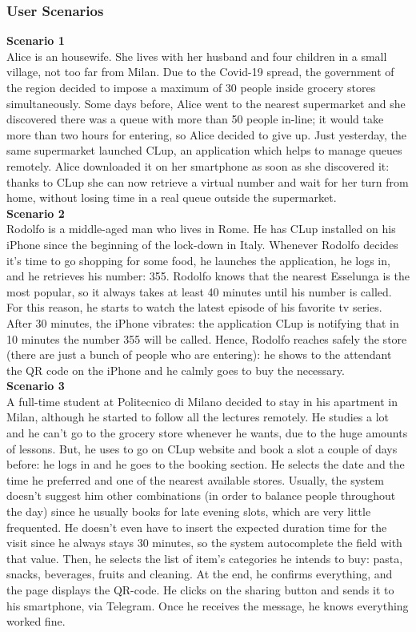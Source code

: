 \documentclass[table, 12pt]{article}
\begin{document}
\subsubsection{User Scenarios}
\textbf{Scenario 1}\\
Alice is an housewife. She lives with her husband and four children in a small village, not too far from Milan. Due to the Covid-19 spread, the government of the region decided to impose a maximum of 30 people inside grocery stores simultaneously. Some days before, Alice went to the nearest supermarket and she discovered there was a queue with more than 50 people in-line; it would take more than two hours for entering, so Alice decided to give up. Just yesterday, the same supermarket launched CLup, an application which helps to manage queues remotely. Alice downloaded it on her smartphone as soon as she discovered it: thanks to CLup she can now retrieve a virtual number and wait for her turn from home, without losing time in a real queue outside the supermarket.\\

\textbf{Scenario 2}\\
Rodolfo is a middle-aged man who lives in Rome. He has CLup installed on his iPhone since the beginning of the lock-down in Italy. Whenever Rodolfo decides it's time to go shopping for some food, he launches the application, he logs in, and he retrieves his number: 355. Rodolfo knows that the nearest Esselunga is the most popular, so it always takes at least 40 minutes until his number is called. For this reason, he starts to watch the latest episode of his favorite tv series. After 30 minutes, the iPhone vibrates: the application CLup is notifying that in 10 minutes the number 355 will be called. Hence, Rodolfo reaches safely the store (there are just a bunch of people who are entering): he shows to the attendant the QR code on the iPhone and he calmly goes to buy the necessary. \\

\textbf{Scenario 3}\\
A full-time student at Politecnico di Milano decided to stay in his apartment in Milan, although he started to follow all the lectures remotely. He studies a lot and he can't go to the grocery store whenever he wants, due to the huge amounts of lessons. But, he uses to go on CLup website and book a slot a couple of days before: he logs in and he goes to the booking section. He selects the date and the time he preferred and one of the nearest available stores. Usually, the system doesn't suggest him other combinations (in order to balance people throughout the day) since he usually books for late evening slots, which are very little frequented. He doesn't even have to insert the expected duration time for the visit since he always stays 30 minutes, so the system autocomplete the field with that value. Then, he selects the list of item's categories he intends to buy: pasta, snacks, beverages, fruits and cleaning. At the end, he confirms everything, and the page displays the QR-code. He clicks on the sharing button and sends it to his smartphone, via Telegram. Once he receives the message, he knows everything worked fine.\\
\end{document}
